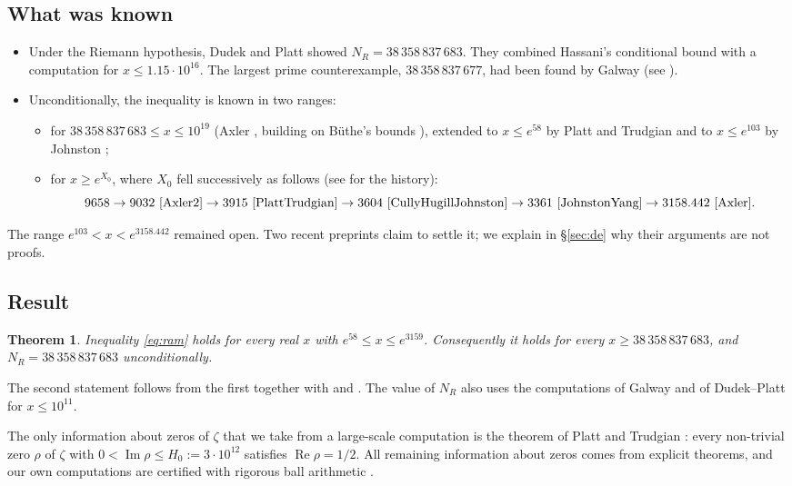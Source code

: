 \documentclass[11pt]{amsart}
\numberwithin{equation}{section}
\newtheorem{theorem}{Theorem}[section]
\theoremstyle{definition}
\theoremstyle{remark}
\newcommand{\Rp}{\operatorname{Re}}
\newcommand{\Ip}{\operatorname{Im}}
\begin{document}
\subsection*{What was known}
\begin{itemize}
\item Under the Riemann hypothesis, Dudek and Platt \cite{DudekPlatt} showed $N_R = 38\,358\,837\,683$.
  They combined Hassani's conditional bound \cite{Hassani} with a computation for $x \le 1.15\cdot 10^{16}$.
  The largest prime counterexample, $38\,358\,837\,677$, had been found by Galway (see \cite{DudekPlatt}).
\item Unconditionally, the inequality is known in two ranges:
  \begin{itemize}
  \item for $38\,358\,837\,683 \le x \le 10^{19}$ (Axler \cite{Axler2}, building on B\"uthe's bounds \cite{Buthe2018}), extended to $x\le e^{58}$ by Platt and Trudgian \cite{PlattTrudgian} and to $x \le e^{103}$ by Johnston \cite[Thm.~5.1]{Johnston};
  \item for $x \ge e^{X_0}$, where $X_0$ fell successively as follows (see \cite{Axler} for the history):
  \[
  9658 \to 9032\ \text{\cite{Axler2}} \to 3915\ \text{\cite{PlattTrudgian}} \to 3604\ \text{\cite{CullyHugillJohnston}} \to 3361\ \text{\cite{JohnstonYang}} \to 3158.442\ \text{\cite{Axler}}.
  \]
  \end{itemize}
\end{itemize}
The range $e^{103} < x < e^{3158.442}$ remained open.
Two recent preprints \cite{De1,De2} claim to settle it; we explain in \S\ref{sec:de} why their arguments are not proofs.

\subsection*{Result}
\begin{theorem}\label{thm:main}
Inequality \eqref{eq:ram} holds for every real $x$ with $e^{58} \le x \le e^{3159}$.
Consequently it holds for every $x \ge 38\,358\,837\,683$, and $N_R = 38\,358\,837\,683$ unconditionally.
\end{theorem}

The second statement follows from the first together with \cite[Thm.~5.1]{Johnston} and \cite[Thm.~1.1]{Axler}.
The value of $N_R$ also uses the computations of Galway and of Dudek--Platt \cite{DudekPlatt} for $x \le 10^{11}$.

The only information about zeros of $\zeta$ that we take from a large-scale computation is the theorem of Platt and Trudgian \cite{PlattTrudgianRH}:
every non-trivial zero $\rho$ of $\zeta$ with $0 < \Ip\rho \le H_0 := 3\cdot 10^{12}$ satisfies $\Rp \rho = 1/2$.
All remaining information about zeros comes from explicit theorems, and our own computations are certified with rigorous ball arithmetic \cite{arb}.
\end{document}
